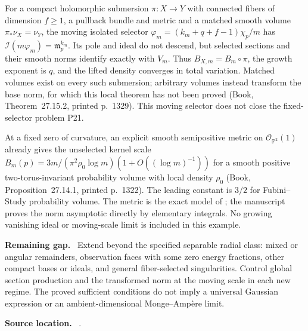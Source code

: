 \documentclass[11pt]{article}
\newcommand{\field}[1]{\par\medskip\noindent\textbf{#1.}\ }
\begin{document}
For a compact holomorphic submersion $\pi:X\to Y$ with connected fibers of dimension $f\geq1$, a pullback bundle and metric and a matched smooth volume $\pi_*\nu_X=\nu_Y$, the moving isolated selector $\varphi_m=(k_m+q+f-1)\chi_p/m$ has $\mathcal I(m\varphi_m)=\mathfrak m_p^{k_m}$. Its pole and ideal do not descend, but selected sections and their smooth norms identify exactly with $V_m$. Thus $B_{X,m}=B_m\circ\pi$, the growth exponent is $q$, and the lifted density converges in total variation. Matched volumes exist on every such submersion; arbitrary volumes instead transform the base norm, for which this local theorem has not been proved (Book, Theorem~27.15.2, printed p.~1329). This moving selector does not close the fixed-selector problem P21.

At a fixed zero of curvature, an explicit smooth semipositive metric on $\mathcal O_{\mathbb P^2}(1)$ already gives the unselected kernel scale $B_m(p)=3m/(\pi^2\rho_0\log m)(1+O((\log m)^{-1}))$ for a smooth positive two-torus-invariant probability volume with local density $\rho_0$ (Book, Proposition~27.14.1, printed p.~1322). The leading constant is $3/2$ for Fubini--Study probability volume. The metric is the exact model of \cite[Example I.15, pp.~9--10]{ChiangKernel26}; the manuscript proves the norm asymptotic directly by elementary integrals. No growing vanishing ideal or moving-scale limit is included in this example.
\field{Remaining gap} Extend beyond the specified separable radial class: mixed or angular remainders, observation faces with some zero energy fractions, other compact bases or ideals, and general fiber-selected singularities. Control global section production and the transformed norm at the moving scale in each new regime. The proved sufficient conditions do not imply a universal Gaussian expression or an ambient-dimensional Monge--Amp\`ere limit.
\field{Source location} .
\end{document}
